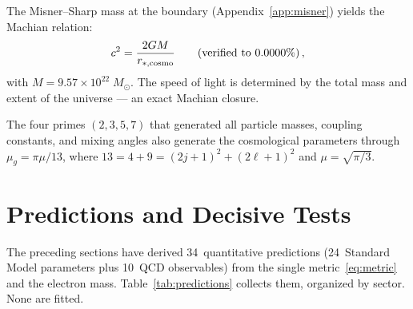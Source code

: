 \documentclass[aps,prd,twocolumn,superscriptaddress,nofootinbib,longbibliography]{revtex4-2}
\newcommand{\mug}{\mu_g}
\begin{document}
The Misner--Sharp mass at the boundary
(Appendix~\ref{app:misner}) yields the Machian relation:
\begin{equation}\label{eq:machian}
  c^2 = \frac{2GM}{r_{*,\rm cosmo}}
  \qquad(\text{verified to }0.0000\%)\,,
\end{equation}
with $M = 9.57 \times 10^{22}\;M_\odot$.  The speed of light is
determined by the total mass and extent of the universe --- an exact
Machian closure.

The four primes $(2, 3, 5, 7)$ that generated all particle masses,
coupling constants, and mixing angles also generate the cosmological
parameters through $\mug = \pi\mu/13$, where
$13 = 4 + 9 = (2j+1)^2 + (2\ell+1)^2$ and
$\mu = \sqrt{\pi/3}$.

\section{Predictions and Decisive Tests}\label{sec:falsify}

The preceding sections have derived 34~quantitative predictions
(24~Standard Model parameters plus 10~QCD observables) from the
single metric~\eqref{eq:metric} and the electron mass.
Table~\ref{tab:predictions} collects them, organized by sector.  None
are fitted.
\end{document}
